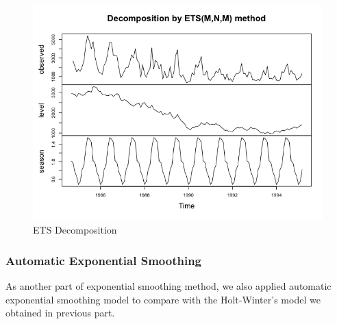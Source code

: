 \documentclass[journal, a4paper]{IEEEtran}
\begin{document}
\begin{figure}[H]
\begin{center}
\includegraphics[scale=0.3]{fig1/ets_plot.png}
\caption{ETS Decomposition}
\label{fig1:ets_plot}
\end{center}
\end{figure}

\subsubsection{Automatic Exponential Smoothing}
As another part of exponential smoothing method, we also applied automatic exponential smoothing model to compare with the Holt-Winter's model we obtained in previous part.
\end{document}

